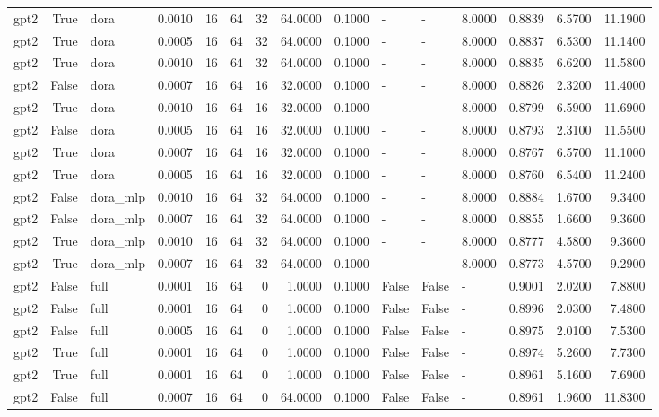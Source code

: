 \begin{tabular}{lrlrrrrrrlllrrr}
gpt2 & True & dora & 0.0010 & 16 & 64 & 32 & 64.0000 & 0.1000 & - & - & 8.0000 & 0.8839 & 6.5700 & 11.1900 \\
gpt2 & True & dora & 0.0005 & 16 & 64 & 32 & 64.0000 & 0.1000 & - & - & 8.0000 & 0.8837 & 6.5300 & 11.1400 \\
gpt2 & True & dora & 0.0010 & 16 & 64 & 32 & 64.0000 & 0.1000 & - & - & 8.0000 & 0.8835 & 6.6200 & 11.5800 \\
gpt2 & False & dora & 0.0007 & 16 & 64 & 16 & 32.0000 & 0.1000 & - & - & 8.0000 & 0.8826 & 2.3200 & 11.4000 \\
gpt2 & True & dora & 0.0010 & 16 & 64 & 16 & 32.0000 & 0.1000 & - & - & 8.0000 & 0.8799 & 6.5900 & 11.6900 \\
gpt2 & False & dora & 0.0005 & 16 & 64 & 16 & 32.0000 & 0.1000 & - & - & 8.0000 & 0.8793 & 2.3100 & 11.5500 \\
gpt2 & True & dora & 0.0007 & 16 & 64 & 16 & 32.0000 & 0.1000 & - & - & 8.0000 & 0.8767 & 6.5700 & 11.1000 \\
gpt2 & True & dora & 0.0005 & 16 & 64 & 16 & 32.0000 & 0.1000 & - & - & 8.0000 & 0.8760 & 6.5400 & 11.2400 \\
gpt2 & False & dora_mlp & 0.0010 & 16 & 64 & 32 & 64.0000 & 0.1000 & - & - & 8.0000 & 0.8884 & 1.6700 & 9.3400 \\
gpt2 & False & dora_mlp & 0.0007 & 16 & 64 & 32 & 64.0000 & 0.1000 & - & - & 8.0000 & 0.8855 & 1.6600 & 9.3600 \\
gpt2 & True & dora_mlp & 0.0010 & 16 & 64 & 32 & 64.0000 & 0.1000 & - & - & 8.0000 & 0.8777 & 4.5800 & 9.3600 \\
gpt2 & True & dora_mlp & 0.0007 & 16 & 64 & 32 & 64.0000 & 0.1000 & - & - & 8.0000 & 0.8773 & 4.5700 & 9.2900 \\
gpt2 & False & full & 0.0001 & 16 & 64 & 0 & 1.0000 & 0.1000 & False & False & - & 0.9001 & 2.0200 & 7.8800 \\
gpt2 & False & full & 0.0001 & 16 & 64 & 0 & 1.0000 & 0.1000 & False & False & - & 0.8996 & 2.0300 & 7.4800 \\
gpt2 & False & full & 0.0005 & 16 & 64 & 0 & 1.0000 & 0.1000 & False & False & - & 0.8975 & 2.0100 & 7.5300 \\
gpt2 & True & full & 0.0001 & 16 & 64 & 0 & 1.0000 & 0.1000 & False & False & - & 0.8974 & 5.2600 & 7.7300 \\
gpt2 & True & full & 0.0001 & 16 & 64 & 0 & 1.0000 & 0.1000 & False & False & - & 0.8961 & 5.1600 & 7.6900 \\
gpt2 & False & full & 0.0007 & 16 & 64 & 0 & 64.0000 & 0.1000 & False & False & - & 0.8961 & 1.9600 & 11.8300 \\

\end{tabular}
